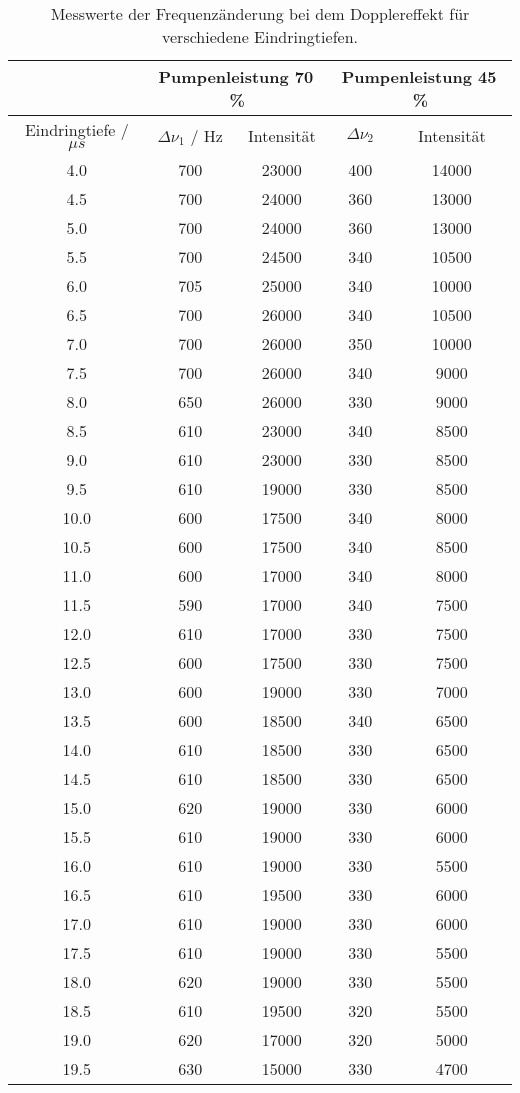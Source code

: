 \begin{table}[H] %
  \centering
  \begin{tabular}{c||c c||c c}
    & \multicolumn{2}{c||}{Pumpenleistung 70\,\%} & \multicolumn{2}{c}{Pumpenleistung 45\,\%} \\
    \hline
    Eindringtiefe / $\mu s$ & $\Delta \nu_1$ / Hz & Intensität & $\Delta \nu_2$ & Intensität \\
    \hline
    4.0  & 700 & 23000 & 400 & 14000 \\
    4.5  & 700 & 24000 & 360 & 13000 \\
    5.0  & 700 & 24000 & 360 & 13000 \\
    5.5  & 700 & 24500 & 340 & 10500 \\
    6.0  & 705 & 25000 & 340 & 10000 \\
    6.5  & 700 & 26000 & 340 & 10500 \\
    7.0  & 700 & 26000 & 350 & 10000 \\
    7.5  & 700 & 26000 & 340 & 9000  \\
    8.0  & 650 & 26000 & 330 & 9000  \\
    8.5  & 610 & 23000 & 340 & 8500  \\
    9.0  & 610 & 23000 & 330 & 8500  \\
    9.5  & 610 & 19000 & 330 & 8500  \\
    10.0 & 600 & 17500 & 340 & 8000  \\
    10.5 & 600 & 17500 & 340 & 8500  \\
    11.0 & 600 & 17000 & 340 & 8000  \\
    11.5 & 590 & 17000 & 340 & 7500  \\
    12.0 & 610 & 17000 & 330 & 7500  \\
    12.5 & 600 & 17500 & 330 & 7500  \\
    13.0 & 600 & 19000 & 330 & 7000  \\
    13.5 & 600 & 18500 & 340 & 6500  \\
    14.0 & 610 & 18500 & 330 & 6500  \\
    14.5 & 610 & 18500 & 330 & 6500  \\
    15.0 & 620 & 19000 & 330 & 6000  \\
    15.5 & 610 & 19000 & 330 & 6000  \\
    16.0 & 610 & 19000 & 330 & 5500  \\
    16.5 & 610 & 19500 & 330 & 6000  \\
    17.0 & 610 & 19000 & 330 & 6000  \\
    17.5 & 610 & 19000 & 330 & 5500  \\
    18.0 & 620 & 19000 & 330 & 5500  \\
    18.5 & 610 & 19500 & 320 & 5500  \\
    19.0 & 620 & 17000 & 320 & 5000  \\
    19.5 & 630 & 15000 & 330 & 4700  \\
    \hline
  \end{tabular}
  \caption{Messwerte der Frequenzänderung bei dem Dopplereffekt für verschiedene Eindringtiefen.}
  \label{tab:Mess2}
\end{table}
